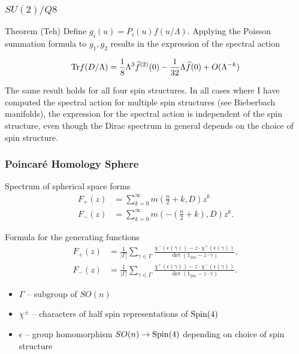 \documentclass{beamer}
\def\Spin{{\rm Spin}}
\def\Tr{{\rm Tr}}
\begin{document}
\begin{frame}
	\frametitle{$SU(2)/Q8$}
	\begin{block}{Theorem (Teh)}
		Define $g_i(u) = P_i(u)f(u/\Lambda)$. Applying the Poisson summation formula to $g_1, g_2$ results in the expression of the spectral action
		
		\[
		\Tr f(D/\Lambda) = \frac{1}{8}\Lambda^3 \widehat{f}^{(2)}(0) - \frac{1}{32}\Lambda \widehat{f}(0) + O(\Lambda^{-k})
		\]
	\end{block}
	
	\pause
	
	\begin{block}{}
		The same result holds for all four spin structures. In all cases where I have computed the spectral action for multiple spin structures (see Bieberbach manifolds), the expression for the spectral action is independent of the spin structure, even though the Dirac spectrum in general depends on the choice of spin structure.
	\end{block}
\end{frame}

\begin{frame}
	\frametitle{Poincar\'e Homology Sphere}
	\begin{block}{Spectrum of spherical space forms}
	\begin{align*}
F_+(z) & = \sum_{k=0}^{\infty} m (\frac{n}{2}+k,D)z^k  \\
F_-(z) &= \sum_{k=0}^{\infty} m (-(\frac{n}{2}+k),D)z^k .
\end{align*}
	\end{block}
\end{frame}

\begin{frame}
	\begin{block}{Formula for the generating functions}
		\begin{align*}
F_+ (z) &= \frac{1}{| \Gamma |} \sum_{\gamma \in \Gamma}  \frac{\chi^-(\epsilon(\gamma)) - z \cdot \chi^+ (\epsilon(\gamma))}{\det(1_{2m} - z \cdot \gamma)}, \\ \label{Spmultgen2}
F_-(z) &= \frac{1}{| \Gamma |} \sum_{\gamma \in \Gamma} \frac{\chi^+(\epsilon(\gamma)) - z \cdot \chi^- (\epsilon(\gamma))}{\det(1_{2m} - z \cdot \gamma)}.
		\end{align*}
	\end{block}
	
	\begin{block}{}
	\begin{itemize}
		\item $\Gamma$ -- subgroup of $SO(n)$
		\item $\chi^{\pm}$ -- characters of half spin representations of $\Spin(4)$
		\item $\epsilon$ -- group homomorphism $SO(n) \rightarrow \Spin(4)$ depending on choice of spin structure
	\end{itemize}
	\end{block}
\end{frame}
\end{document}
